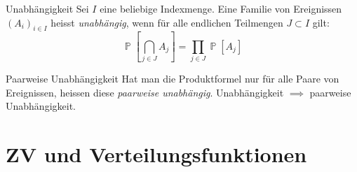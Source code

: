 \documentclass[a4paper,10pt]{article}
\def\R{\mathbb{R}}
\def\F{\mathcal{F}}
\renewcommand{\P}{\operatorname{\mathbb{P}}}
\numberwithin{equation}{section}
\begin{document}
\begin{mainbox}{Unabhängigkeit}
    Sei \( I \) eine beliebige Indexmenge. Eine Familie von Ereignissen \( (A_i)_{i \in I} \) heisst \emph{unabhängig}, wenn für alle endlichen Teilmengen \( J \subset I \) gilt:
    \[
        \P \left[ \bigcap_{j \in J} A_j \right] = \prod_{j \in J} \P[A_j]
    \]
\end{mainbox}

\begin{subbox}{Paarweise Unabhängigkeit}
    Hat man die Produktformel nur für alle Paare von Ereignissen, heissen diese \emph{paarweise unabhängig}. Unabhängigkeit \( \implies \) paarweise Unabhängigkeit.
\end{subbox}

\section{ZV und Verteilungsfunktionen}





\end{document}

